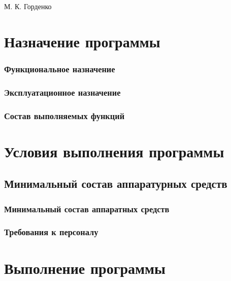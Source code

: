 \documentclass[a4paper,12pt]{article}
\begin{document}

    {М. К. Горденко}

    \firstPage
    \newpage
    \secondPage
    \newpage
    \thirdPage
    \newpage


    \section{Назначение программы}

    \subsubsection{Функциональное назначение }

    \subsubsection{Эксплуатационное назначение}

    \subsubsection{Состав выполняемых функций}

    \newpage


    \section{Условия выполнения программы}
    \subsection{Минимальный состав аппаратурных средств
    }

    \subsubsection{Минимальный состав аппаратных средств}

    \subsubsection{Требования к персоналу}

    \newpage


    \section{Выполнение программы}
\end{document}
